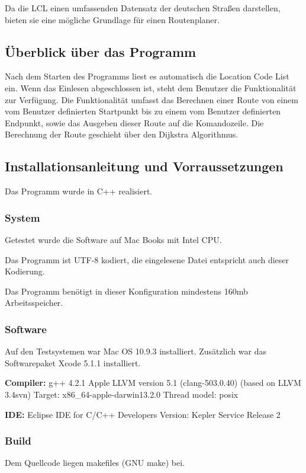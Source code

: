 \documentclass[12pt, a4paper, ngerman]{article}
\begin{document}
Da die LCL einen umfassenden Datensatz der deutschen Straßen darstellen, bieten sie eine mögliche Grundlage für einen Routenplaner. 

\subsection{Überblick über das Programm}
Nach dem Starten des Programms liest es automatisch die Location Code List ein. Wenn das Einlesen abgeschlossen ist, steht dem Benutzer die Funktionalität zur Ver\-fügung. Die Funktionalität umfasst das Berechnen einer Route von einem vom Benutzer definierten Startpunkt bis zu einem vom Benutzer definierten Endpunkt, sowie das Ausgeben dieser Route auf die Komandozeile. Die Berechnung der Route geschieht über den Dijkstra Algorithmus.

\subsection{Installationsanleitung und Vorraussetzungen}
Das Programm wurde in C++ realisiert. 
\subsubsection{System}
Getestet wurde die Software auf Mac Books mit Intel CPU.

Das Programm ist UTF-8 kodiert, die eingelesene Datei entspricht auch dieser Kodierung.

Das Programm benötigt in dieser Konfiguration mindestens 160mb Arbeitsspeicher.

\subsubsection{Software}
Auf den Testsystemen war Mac OS 10.9.3 installiert. Zusätzlich war das Softwarepaket Xcode 5.1.1 installiert. 

\textbf{Compiler:}\newline
 g++ 4.2.1  \newline
Apple LLVM version 5.1 (clang-503.0.40) (based on LLVM 3.4svn) \newline
Target: x86\_64-apple-darwin13.2.0 \newline
Thread model: posix


\textbf{IDE:}\newline
Eclipse IDE for C/C++ Developers \newline
Version: Kepler Service Release 2

\subsubsection{Build}
Dem Quellcode liegen makefiles (GNU make) bei.
\end{document}
